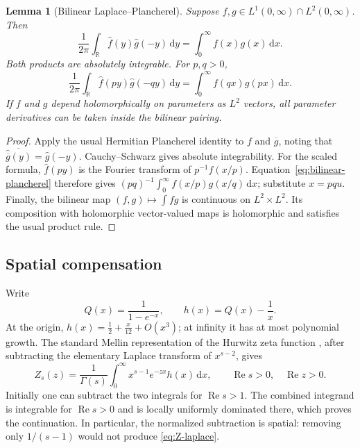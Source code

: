 \documentclass[11pt,a4paper]{article}
\newtheorem{lemma}[theorem]{Lemma}
\theoremstyle{definition}
\numberwithin{equation}{section}
\newcommand{\R}{\mathbb R}
\newcommand{\Rea}{\operatorname{Re}}
\newcommand{\dd}{\,\mathrm d}
\begin{document}
\begin{lemma}[Bilinear Laplace--Plancherel]\label{thm:plancherel}
Suppose $f,g\in L^1(0,\infty)\cap L^2(0,\infty)$. Then
\begin{equation}\label{eq:bilinear-plancherel}
 \frac1{2\pi}\int_{\R}\widehat f(y)\widehat g(-y)\dd y
     =\int_0^\infty f(x)g(x)\dd x.
\end{equation}
Both products are absolutely integrable. For $p,q>0$,
\begin{equation}\label{eq:scaled-plancherel}
 \frac1{2\pi}\int_{\R}\widehat f(py)\widehat g(-qy)\dd y
     =\int_0^\infty f(qx)g(px)\dd x.
\end{equation}
If $f$ and $g$ depend holomorphically on parameters as $L^2$ vectors, all
parameter derivatives can be taken inside the bilinear pairing.
\end{lemma}
\begin{proof}
Apply the usual Hermitian Plancherel identity to $f$ and $\overline g$,
noting that $\overline{\widehat{\overline g}(y)}=\widehat g(-y)$.
Cauchy--Schwarz gives absolute integrability. For the scaled formula,
$\widehat f(py)$ is the Fourier transform of $p^{-1}f(x/p)$.
Equation~\eqref{eq:bilinear-plancherel} therefore gives
$(pq)^{-1}\int_0^\infty f(x/p)g(x/q)\dd x$; substitute $x=pqu$.
Finally, the bilinear map $(f,g)\mapsto\int fg$ is continuous on
$L^2\times L^2$. Its composition with holomorphic vector-valued maps is
holomorphic and satisfies the usual product rule.
\end{proof}

\subsection{Spatial compensation}
Write
\begin{equation}\label{eq:h-basic}
 Q(x)=\frac1{1-e^{-x}},\qquad h(x)=Q(x)-\frac1x.
\end{equation}
At the origin, $h(x)=\frac12+\frac{x}{12}+O(x^3)$; at infinity it has at
most polynomial growth. The standard Mellin representation of the Hurwitz
zeta function \cite{dlmf-zeta}, after subtracting the elementary Laplace
transform of $x^{s-2}$, gives
\begin{equation}\label{eq:Z-laplace}
 Z_s(z)=\frac1{\Gamma(s)}\int_0^\infty
            x^{s-1}e^{-zx}h(x)\dd x,
 \qquad \Rea s>0,\quad \Rea z>0.
\end{equation}
Initially one can subtract the two integrals for $\Rea s>1$.
The combined integrand is integrable for $\Rea s>0$ and is locally
uniformly dominated there, which proves the continuation. In particular,
the normalized subtraction is spatial: removing only $1/(s-1)$ would
not produce \eqref{eq:Z-laplace}.
\end{document}
